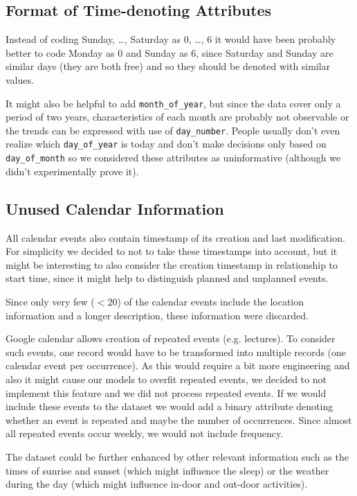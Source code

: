 \documentclass[a4paper, 12pt]{article}
\begin{document}
\subsection{Format of Time-denoting Attributes}
Instead of coding Sunday, \dots, Saturday as 0, \dots, 6 it would have been 
probably better to code Monday as 0 and Sunday as 6, since 
Saturday and Sunday are similar days (they are both free) and so they 
should be denoted with similar values.

\medskip

It might also be helpful to add \texttt{month\_of\_year}, but since the data cover
only a period of two years, characteristics of each month are probably not observable 
or the trends can be expressed with use of \texttt{day\_number}. People usually
don't even realize which \texttt{day\_of\_year} is today and 
don't make decisions only based on \texttt{day\_of\_month} so we considered these
attributes as uninformative (although we didn't experimentally prove it).

\subsection{Unused Calendar Information}
All calendar events also contain timestamp of its creation and last modification.
For simplicity we decided to not to take these timestamps into account, 
but it might be interesting to also consider the creation 
timestamp in relationship to start time, since it might help to distinguish 
planned and unplanned events. 

Since only very few ($<20$) of the calendar events include the location
information and a longer description, these information were discarded. 

Google calendar allows creation of repeated events (e.g. lectures).
To consider such events, one record would have to be transformed into multiple
records (one calendar event per occurrence). As this would require a bit more
engineering and also it might cause our models to overfit repeated events, we decided
to not implement this feature and we did not process repeated events.
If we would include these events to the dataset we would add a binary attribute 
denoting whether an event is repeated and maybe the number of occurrences. 
Since almost all repeated events occur weekly, we would not include frequency.

The dataset could be further enhanced by other relevant information such as
the times of sunrise and sunset (which might influence the sleep) or the weather
during the day (which might influence in-door and out-door activities).
\end{document}
